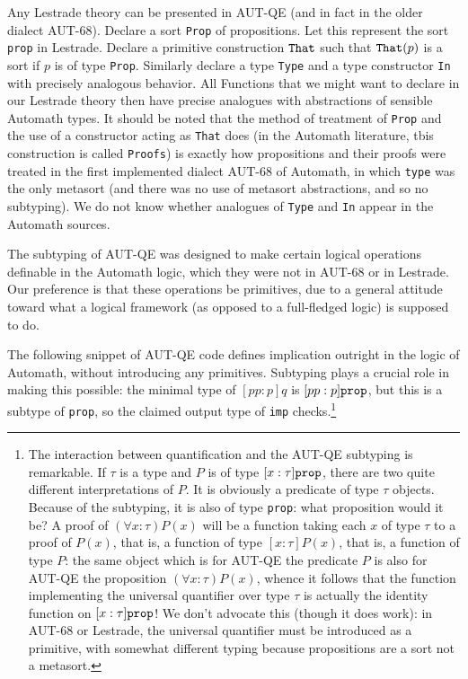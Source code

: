 \documentclass{article}
\begin{document}
Any Lestrade theory can be presented in AUT-QE (and in fact in the older dialect AUT-68).  Declare a sort {\tt Prop} of propositions.  Let this represent the
sort {\tt prop} in Lestrade.  Declare a primitive construction ${\tt That}$ such that ${\tt That}(p)$ is a sort if $p$ is of type {\tt Prop}.
Similarly declare a type {\tt Type} and a type constructor {\tt In} with precisely analogous behavior.  All Functions that we might want to declare
in our Lestrade theory then have precise analogues with abstractions of sensible Automath types.  It should be noted that the method of treatment of {\tt Prop}
and the use of a constructor acting as {\tt That} does (in the Automath literature, tbis construction is called {\tt Proofs}) is exactly how propositions
and their proofs were treated in the first implemented dialect AUT-68 of Automath, in which {\tt type} was the only metasort (and there was no use
of metasort abstractions, and so no subtyping).  We do not know whether analogues of {\tt Type} and {\tt In} appear in the Automath sources.

The subtyping of AUT-QE was designed to make certain logical operations definable in the Automath logic, which they were not in AUT-68 or in Lestrade.
Our preference is that these operations be primitives, due to a general attitude toward what a logical framework (as opposed to a full-fledged logic) is supposed to do.

The following snippet of AUT-QE code defines implication outright in the logic of Automath, without introducing any primitives.  Subtyping plays a crucial role in making this possible:  the minimal type of $[pp:p]q$ is $[pp:p]{\tt prop}$, but this is a subtype of {\tt prop}, so the claimed output  type of {\tt imp} checks.\footnote{The interaction between quantification and the AUT-QE subtyping is remarkable.  If $\tau$ is a type and $P$ is of type $[x:\tau]{\tt prop}$, there are two quite different interpretations of $P$.  It is obviously a predicate of type $\tau$ objects.  Because of the subtyping, it is also of type {\tt prop}:  what proposition would it be?  A proof of $(\forall x:\tau)P(x)$ will be a function taking each $x$ of type $\tau$ to a proof of $P(x)$, that is, a function of type $[x:\tau]P(x)$, that is, a function of type $P$:  the same object which is for AUT-QE the predicate $P$ is also for AUT-QE the proposition $(\forall x:\tau)P(x)$, whence it follows that the function implementing the universal quantifier over type $\tau$ is actually the identity function on $[x:\tau]{\tt prop}$!  We don't advocate this (though it does work):  in AUT-68 or Lestrade, the universal quantifier must be introduced as a primitive, with somewhat different typing because propositions are a sort not a metasort.}
\end{document}

